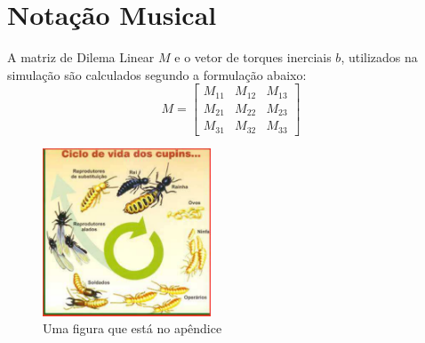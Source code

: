 \section{Notação Musical}\label{ape:notacao}

A matriz de Dilema Linear $M$ e o vetor de torques inerciais $b$,
utilizados na simulação são calculados segundo a formulação 
abaixo:
\begin{equation}
M=\left[ \begin{array}{ccc}
M_{11} & M_{12} & M_{13} \\
M_{21} & M_{22} & M_{23} \\
M_{31} & M_{32} & M_{33}
\end{array} \right]
\end{equation}

\begin{figure}[h]
\centering
\includegraphics[height=5cm, width=5cm]{ApeA/pragas_ciclo_cupim}
\caption{Uma figura que está no apêndice}\label{FD}
\end{figure}
